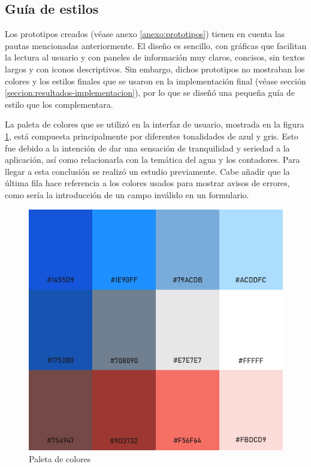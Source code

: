 \documentclass[pdftex,11pt,a4paper]{book}
\begin{document}

\subsection{Guía de estilos}

Los prototipos creados (véase anexo \ref{anexo:prototipos}) tienen en cuenta las pautas mencionadas anteriormente. El diseño es sencillo, con gráficas que facilitan la lectura al usuario y con paneles de información muy claros, concisos, sin textos largos y con iconos descriptivos.
Sin embargo, dichos prototipos no mostraban los colores y los estilos finales que se usaron en la implementación final (véase sección \ref{seccion:resultados-implementacion}), por lo que se diseñó una pequeña guía de estilo que los complementara. 

La paleta de colores que se utilizó en la interfaz de usuario, mostrada en la figura \ref{fig:paleta}, está compuesta principalmente por diferentes tonalidades de azul y gris. Esto fue debido a la intención de dar una sensación de tranquilidad y seriedad a la aplicación, así como relacionarla con la temática del agua y los contadores. Para llegar a esta conclusión se realizó un estudio previamente. Cabe añadir que la última fila hace referencia a los colores usados para mostrar avisos de errores, como sería la introducción de un campo inválido en un formulario.

\begin{figure}[H]
 \centering
 \includegraphics [scale=0.30] {images/disenyo/paleta-final.png}
 \caption{Paleta de colores} \label{fig:paleta}
 \end{figure}
\end{document}
